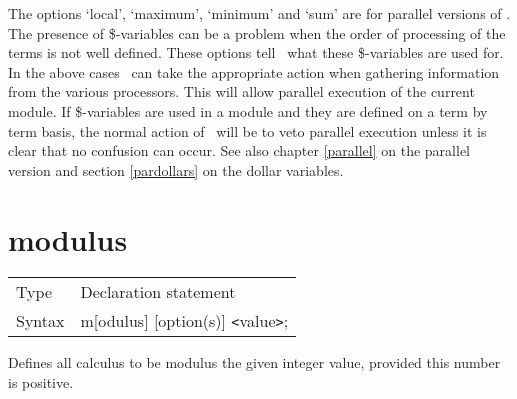 

\noindent The options `local', `maximum', `minimum' and `sum' are for 
parallel versions of \FORM. The presence of \$-variables can be a problem 
when the order of processing of the terms is not well defined. These 
options tell \FORM\ what these \$-variables are used for. In the above 
cases \FORM\ can take the appropriate action when gathering information 
from the various processors. This will allow
parallel execution of the current module. If
\$-variables are used in a module and they are defined on a term by term
basis, the normal action of \FORM\ will be to veto parallel execution unless
it is clear that no confusion can occur. See also chapter \ref{parallel} on
the parallel version and section \ref{pardollars} on the dollar variables.\vspace{10mm}

 
\section{modulus}
\label{substamodulus}

\noindent \begin{tabular}{ll}
Type & Declaration statement\\
Syntax & m[odulus] [option(s)] {\tt<}value{\tt>};
\end{tabular} \vspace{4mm}

\noindent Defines all calculus to be modulus the given 
integer value, provided this number is positive.


